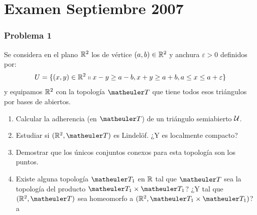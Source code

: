 \section{Examen Septiembre 2007}
\subsubsection{Problema 1}
Se considera en el plano $\mathbb{R}^2$ los  de vértice $(a,b)\in \mathbb{R}^2$ y anchura $\varepsilon > 0$ definidos por:
\begin{equation}
	U = \{(x,y) \in \mathbb{R}^2 \shortparallel x-y \geq a - b, x + y \geq a + b, a \leq x \le a + \varepsilon\}
\end{equation}
y equipamos $\mathbb{R}^2$ con la topología $\T$ que tiene todos esos triángulos por bases de abiertos.
\begin{enumerate}
	\item Calcular la adherencia (en $\T$) de un triángulo semiabierto $\mathcal{U}$.
	\item Estudiar si $(\R^2,\T)$ es Lindelöf. ¿Y es localmente compacto?
	\item Demostrar que los únicos conjuntos conexos para esta topología son los puntos.
	\item Existe alguna topología $\T_1$ en $\mathbb{R}$ tal que $\T$ sea la topología del producto $\T_1 \times \T_1$? ¿Y tal que $(\R^2,\T)$ sea homeomorfo a $(\R^2,\T_1 \times \T_1)$?
	{\large a}
\end{enumerate}
